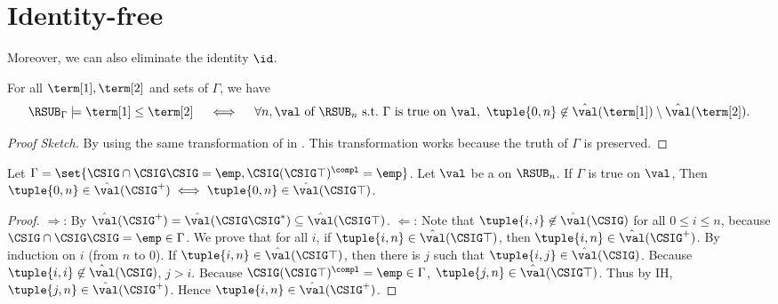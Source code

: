 \section{Identity-free}
Moreover, we can also eliminate the identity $\id$.

\begin{proposition}\label{proposition: ORD lr Gamma}
    For all  $\term[1], \term[2]$ and sets of  $\Gamma$,
    we have
    \[\RSUB_{\Gamma} \models \term[1] \le \term[2] \quad\iff\quad \forall n, \mbox{$\val$ of $\RSUB_{n}$ s.t.\ $\Gamma$ is true on $\val$},\  \tuple{0, n} \not\in \hat{\val}(\term[1]) \setminus \hat{\val}(\term[2]).\]
\end{proposition}
\begin{proof}[Proof Sketch]
    By using the same transformation of  in .
    This transformation works because the truth of $\Gamma$ is preserved.
\end{proof}


\begin{proposition}\label{proposition: star and identity to top}
    Let $\Gamma = \set{\CSIG \cap \CSIG \CSIG = \emp, \CSIG (\CSIG \top)^{\compl} = \emp}$.
    Let $\val$ be a  on $\RSUB_{n}$.
    If $\Gamma$ is true on $\val$, Then $\tuple{0, n} \in \hat{\val}(\CSIG^{+}) \iff \tuple{0, n} \in \hat{\val}(\CSIG \top)$.
\end{proposition}
\begin{proof}
    $\Longrightarrow$:
    By $\hat{\val}(\CSIG^{+}) = \hat{\val}(\CSIG \CSIG^{*}) \subseteq \hat{\val}(\CSIG \top)$.
    $\Longleftarrow$:
    Note that $\tuple{i, i} \not\in \hat{\val}(\CSIG)$ for all $0 \le i \le n$, because $\CSIG \cap \CSIG \CSIG = \emp \in \Gamma$.
    We prove that for all $i$, if $\tuple{i, n} \in \hat{\val}(\CSIG \top)$, then $\tuple{i, n} \in \hat{\val}(\CSIG^{+})$.
    By induction on $i$ (from $n$ to $0$).
    If $\tuple{i, n} \in \hat{\val}(\CSIG \top)$, then there is $j$ such that $\tuple{i, j} \in \hat{\val}(\CSIG)$.
    Because $\tuple{i, i} \not\in \hat{\val}(\CSIG)$, $j > i$.
    Because $\CSIG (\CSIG \top)^{\compl} = \emp \in \Gamma$, $\tuple{j, n} \in \hat{\val}(\CSIG \top)$.
    Thus by IH, $\tuple{j, n} \in \hat{\val}(\CSIG^{+})$.
    Hence $\tuple{i, n} \in \hat{\val}(\CSIG^{+})$.
\end{proof}

